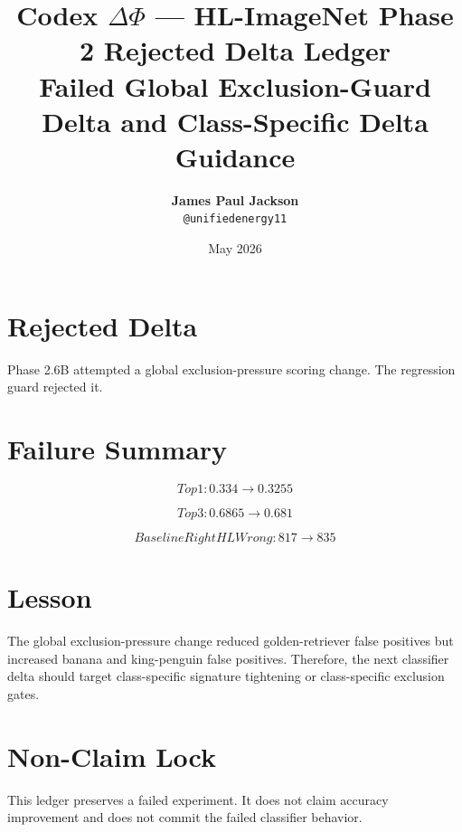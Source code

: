 \documentclass[12pt]{article}
\title{\textbf{Codex $\Delta\Phi$ — HL-ImageNet Phase 2 Rejected Delta Ledger}\\
\large Failed Global Exclusion-Guard Delta and Class-Specific Delta Guidance}
\author{\textbf{James Paul Jackson}\\ \small \texttt{@unifiedenergy11}}
\date{May 2026}
\begin{document}
\maketitle

\section{Rejected Delta}

Phase 2.6B attempted a global exclusion-pressure scoring change. The regression
guard rejected it.

\section{Failure Summary}

\[
Top1: 0.334 \rightarrow 0.3255
\]

\[
Top3: 0.6865 \rightarrow 0.681
\]

\[
BaselineRightHLWrong: 817 \rightarrow 835
\]

\section{Lesson}

The global exclusion-pressure change reduced golden-retriever false positives
but increased banana and king-penguin false positives. Therefore, the next
classifier delta should target class-specific signature tightening or
class-specific exclusion gates.

\section{Non-Claim Lock}

This ledger preserves a failed experiment. It does not claim accuracy
improvement and does not commit the failed classifier behavior.
\end{document}
